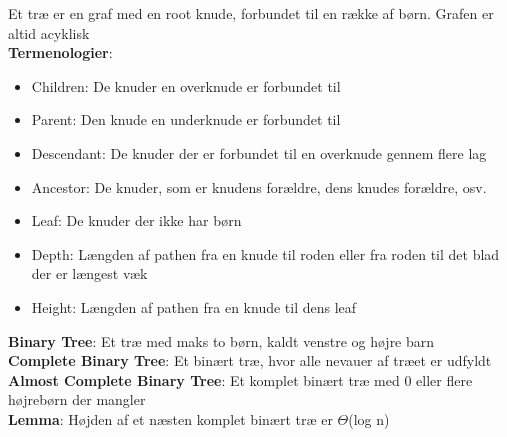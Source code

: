 Et træ er en graf med en root knude, forbundet til en række af børn. Grafen er altid acyklisk\\
\textbf{Termenologier}:
\begin{itemize}
	\item Children: De knuder en overknude er forbundet til
	\item Parent: Den knude en underknude er forbundet til
	\item Descendant: De knuder der er forbundet til en overknude gennem flere lag
	\item Ancestor: De knuder, som er knudens forældre, dens knudes forældre, osv.
	\item Leaf: De knuder der ikke har børn
	\item Depth: Længden af pathen fra en knude til roden eller fra roden til det blad der er længest væk
	\item Height: Længden af pathen fra en knude til dens leaf
\end{itemize}
\textbf{Binary Tree}: Et træ med maks to børn, kaldt venstre og højre barn\\
\textbf{Complete Binary Tree}: Et binært træ, hvor alle nevauer af træet er udfyldt\\
\textbf{Almost Complete Binary Tree}: Et komplet binært træ med 0 eller flere højrebørn der mangler\\
\textbf{Lemma}: Højden af et næsten komplet binært træ er $\Theta$(log n)